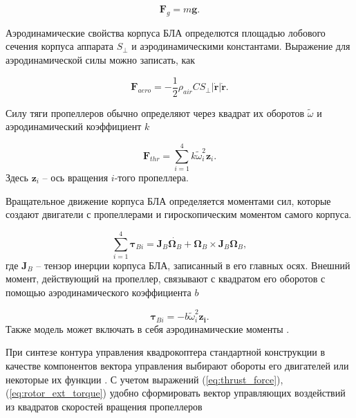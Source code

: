 \begin{equation} \label{eq:gravity_force}
\bm{F}_g = m\bm{g}.
\end{equation}

Аэродинамические свойства корпуса БЛА определются площадью лобового сечения корпуса аппарата {$S_{\perp}$} и аэродинамическими константами. Выражение для аэродинамической силы можно записать, как \cite{Biard01}

\begin{equation} \label{eq:aerodynamic_force}
\bm{F}_{aero} = - \frac{1}{2} \rho_{air} C S_{\perp} |\dot{\bm{r}}| \dot{\bm{r}}.
\end{equation}

Силу тяги пропеллеров обычно определяют через квадрат их оборотов $\tilde\omega$ и аэродинамический коэффициент $k$ \cite{Falconi01}

\begin{equation} \label{eq:thrust_force}
\bm{F}_{thr} = \sum_{i=1}^{4}{ { k \tilde\omega^2_i \bm{z}_i}.}
\end{equation}
Здесь $\bm{z}_i$ -- ось вращения $i$-того пропеллера.
 
Вращательное движение корпуса БЛА определяется моментами сил, которые создают двигатели с пропеллерами и гироскопическим моментом самого корпуса.

\begin{equation} \label{eq:common_rotational_motion}
\sum_{i=1}^{4}{\bm{\tau}_{Bi}} = \bm{J}_B\dot{\bm{\Omega}_B} + \bm{\Omega}_B \times  \bm{J}_B{\bm{\Omega}_B},
\end{equation}
где $\bm{J}_B$ -- тензор инерции корпуса БЛА, записанный в его главных осях.
Внешний момент, действующий на пропеллер, связывают с квадратом его оборотов с помощью аэродинамического коэффициента $b$ \cite{Ryll01}

\begin{equation} \label{eq:rotor_ext_torque}
\bm{\tau}_{Bi} = -b \tilde{\omega}^2_i \bm{z_i}.
\end{equation}
Также модель может включать в себя аэродинамические моменты \cite{Solovev01}.

При синтезе контура управления квадрокоптера стандартной конструкции в качестве компонентов вектора управления выбирают обороты его двигателей или некоторые их функции \cite{Sharifi01, Luukkonen01, Bemporad01}.  С учетом выражений (\ref{eq:thrust_force}), (\ref{eq:rotor_ext_torque}) удобно сформировать вектор управляющих воздействий из квадратов скоростей вращения пропеллеров

